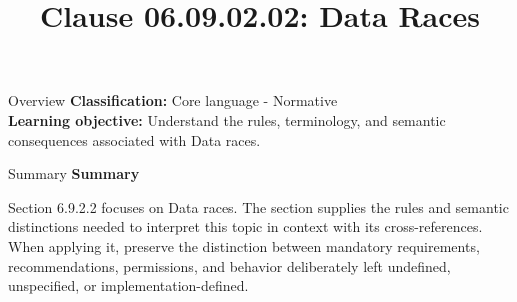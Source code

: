\documentclass[10pt,letterpaper]{article}
\title{Clause 06.09.02.02: Data Races}
\author{}
\date{}
\begin{document}
\maketitle
\begin{CornellOverviewBox}{Overview}
\textbf{Classification:} Core language - Normative\\[2pt]
\textbf{Learning objective:} Understand the rules, terminology, and semantic consequences associated with Data races.
\end{CornellOverviewBox}\begin{CornellSummaryBox}{Summary}
{\sffamily\bfseries\color{Accent} Summary}\par\vspace{3pt}Section 6.9.2.2 focuses on Data races. The section supplies the rules and semantic distinctions needed to interpret this topic in context with its cross-references. When applying it, preserve the distinction between mandatory requirements, recommendations, permissions, and behavior deliberately left undefined, unspecified, or implementation-defined.
\end{CornellSummaryBox}
\end{document}

